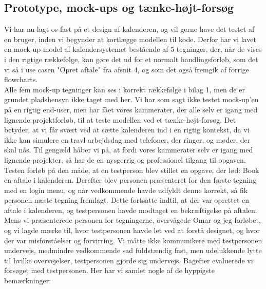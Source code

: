\documentclass[12pt]{article}   %
\begin{document}
\subsection{Prototype, mock-ups og tænke-højt-forsøg}
Vi har nu lagt os fast på et design af kalenderen, og vil gerne have det testet af en bruger, inden vi begynder at kortlægge modellen til kode. Derfor har vi lavet en mock-up model af kalendersystemet bestående af 5 tegninger, der, når de vises i den rigtige rækkefølge, kan gøre det ud for et normalt handlingsforløb, som det vi så i use casen "Opret aftale" fra afsnit 4, og som det også fremgik af forrige flowcharts. \\
Alle fem mock-up tegninger kan ses i korrekt rækkefølge i bilag 1, men de er grundet pladshensyn ikke taget med her. Vi har som sagt ikke testet mock-up'en på en rigtig end-user, men har fået vores kammerater, der alle selv er igang med lignende projektforløb, til at teste modellen ved et tænke-højt-forsøg. Det betyder, at vi får svært ved at sætte kalenderen ind i en rigtig kontekst, da vi ikke kan simulere en travl arbejdsdag med telefoner, der ringer, og møder, der skal nås. Til gengæld håber vi på, at fordi vores kammerater selv er igang med lignende projekter, så har de en nysgerrig og professionel tilgang til opgaven. \\
Testen forløb på den måde, at en testperson blev stillet en opgave, der lød: Book en aftale i kalenderen. Derefter blev personen præsenteret for den første tegning med en login menu, og når vedkommende havde udfyldt denne korrekt, så fik personen næste tegning fremlagt. Dette fortsatte indtil, at der var oprettet en aftale i kalenderen, og testpersonen havde modtaget en bekræftigelse på aftalen. Mens vi præsenterede personen for tegningerne, overvågede Omar og jeg forløbet, og vi lagde mærke til, hvor testpersonen havde let ved at forstå designet, og hvor der var misforståelser og forvirring. Vi måtte ikke kommunikere med testpersonen undervejs, medmindre vedkommende sad fuldstændig fast, men udelukkende lytte til hvilke overvejelser, testpersonen gjorde sig undervejs. Bagefter evaluerede vi forsøget med testpersonen. Her har vi samlet nogle af de hyppigste bemærkninger:
\end{document}
